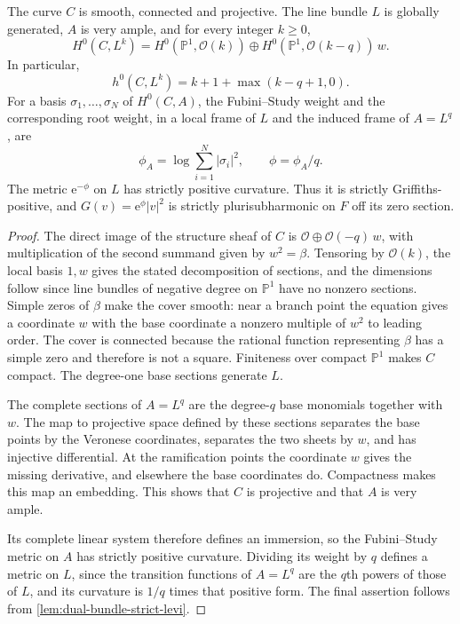 \begin{lemma}\label{lem:ramified-root-complete-sections}
The curve $C$ is smooth, connected and projective. The line bundle $L$ is globally generated, $A$ is very ample, and for every integer $k\geq0$,
\[
 H^0(C,L^k)=
 H^0(\mathbb P^1,\mathcal O(k))
       \oplus H^0(\mathbb P^1,\mathcal O(k-q))\,w.
\]
In particular,
\[
 h^0(C,L^k)=k+1+\max(k-q+1,0).
\]
For a basis $\sigma_1,\ldots,\sigma_N$ of $H^0(C,A)$, the Fubini--Study weight and the corresponding root weight, in a local frame of $L$ and the induced frame of $A=L^q$, are
\[
 \phi_A=\log\sum_{i=1}^N|\sigma_i|^2,
 \qquad \phi=\phi_A/q.
\]
The metric $\mathrm e^{-\phi}$ on $L$ has strictly positive curvature. Thus it is strictly Griffiths-positive, and $G(v)=\mathrm e^{\phi}|v|^2$ is strictly plurisubharmonic on $F$ off its zero section.
\end{lemma}
\begin{proof}
The direct image of the structure sheaf of $C$ is $\mathcal O\oplus\mathcal O(-q)\,w$, with multiplication of the second summand given by $w^2=\beta$. Tensoring by $\mathcal O(k)$, the local basis $1,w$ gives the stated decomposition of sections, and the dimensions follow since line bundles of negative degree on $\mathbb P^1$ have no nonzero sections. Simple zeros of $\beta$ make the cover smooth: near a branch point the equation gives a coordinate $w$ with the base coordinate a nonzero multiple of $w^2$ to leading order. The cover is connected because the rational function representing $\beta$ has a simple zero and therefore is not a square. Finiteness over compact $\mathbb P^1$ makes $C$ compact. The degree-one base sections generate $L$.

The complete sections of $A=L^q$ are the degree-$q$ base monomials together with $w$. The map to projective space defined by these sections separates the base points by the Veronese coordinates, separates the two sheets by $w$, and has injective differential. At the ramification points the coordinate $w$ gives the missing derivative, and elsewhere the base coordinates do. Compactness makes this map an embedding. This shows that $C$ is projective and that $A$ is very ample.

Its complete linear system therefore defines an immersion, so the Fubini--Study metric on $A$ has strictly positive curvature. Dividing its weight by $q$ defines a metric on $L$, since the transition functions of $A=L^q$ are the $q$th powers of those of $L$, and its curvature is $1/q$ times that positive form. The final assertion follows from \cref{lem:dual-bundle-strict-levi}.
\end{proof}


